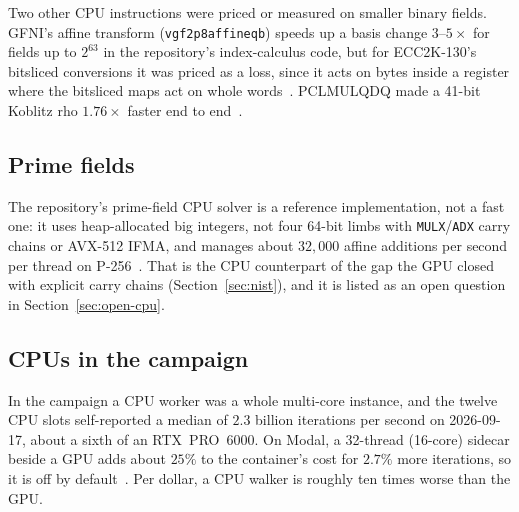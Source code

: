 Two other CPU instructions were priced or measured on smaller binary
fields. GFNI's affine transform (\texttt{vgf2p8affineqb}) speeds up a
basis change $3$--$5\times$ for fields up to $2^{63}$ in the repository's
index-calculus code, but for ECC2K-130's bitsliced conversions it was
priced as a loss, since it acts on bytes inside a register where the
bitsliced maps act on whole words~. PCLMULQDQ made a
41-bit Koblitz rho $1.76\times$ faster end to end~.

\subsection{Prime fields}
\label{sec:cpu-prime}

The repository's prime-field CPU solver is a reference implementation,
not a fast one: it uses heap-allocated big integers, not four 64-bit
limbs with \texttt{MULX}/\texttt{ADX} carry chains or AVX-512 IFMA, and
manages about $32{,}000$ affine additions per second per thread on
P-256~. That is the CPU counterpart of the gap the
GPU closed with explicit carry chains (Section~\ref{sec:nist}), and it is
listed as an open question in Section~\ref{sec:open-cpu}.

\subsection{CPUs in the campaign}
\label{sec:cpu-fleet}

In the campaign a CPU worker was a whole multi-core instance, and the
twelve CPU slots self-reported a median of $2.3$ billion iterations per
second on 2026-09-17, about a sixth of an RTX~PRO~6000. On Modal, a
32-thread (16-core) sidecar beside a GPU adds about $25\%$ to the
container's cost for $2.7\%$ more iterations, so it is off by
default~.
Per dollar, a CPU walker is roughly ten times worse than the GPU.


